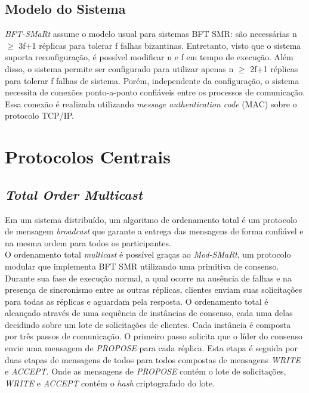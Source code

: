 		\subsection{Modelo do Sistema}
		\textit{BFT-SMaRt} assume o modelo usual para sistemas BFT SMR: são necessárias n $\geq$ 3f+1 réplicas para tolerar f falhas bizantinas. Entretanto, visto que o sistema suporta reconfiguração, é possível modificar n e f em tempo de execução. Além disso, o sistema permite ser configurado para utilizar apenas n $\geq$ 2f+1 réplicas para tolerar f falhas de sistema. Porém, independente da configuração, o sistema necessita de conexões ponto-a-ponto confiáveis entre os processos de comunicação. Essa conexão é realizada utilizando \textit{message authentication code} (MAC) sobre o protocolo TCP/IP.\\
	
	\section{Protocolos Centrais}
	
		\subsection{\textit{Total Order Multicast}}
		Em um sistema distribuído, um algoritmo de ordenamento total é um protocolo de mensagem \textit{broadcast} que garante a entrega das mensagens de forma confiável e na mesma ordem para todos os participantes.\\
		
		O ordenamento total \textit{multicast} é possível graças ao \textit{Mod-SMaRt}, um protocolo modular que implementa BFT SMR utilizando uma primitiva de consenso. Durante sua fase de execução normal, a qual ocorre na ausência de falhas e na presença de sincronismo entre as outras réplicas, clientes enviam suas solicitações para todas as réplicas e aguardam pela resposta. O ordenamento total é alcançado através de uma sequência de instâncias de consenso, cada uma delas decidindo sobre um lote de solicitações de clientes. Cada instância é composta por três passos de comunicação. O primeiro passo solicita que o líder do consenso envie uma mensagem de \textit{PROPOSE} para cada réplica. Esta etapa é seguida por duas etapas de mensagens de todos para todos compostas de mensagens \textit{WRITE} e \textit{ACCEPT}. Onde as mensagens de \textit{PROPOSE} contém o lote de solicitações, \textit{WRITE} e \textit{ACCEPT} contém o \textit{hash} criptografado do lote.\\
		
